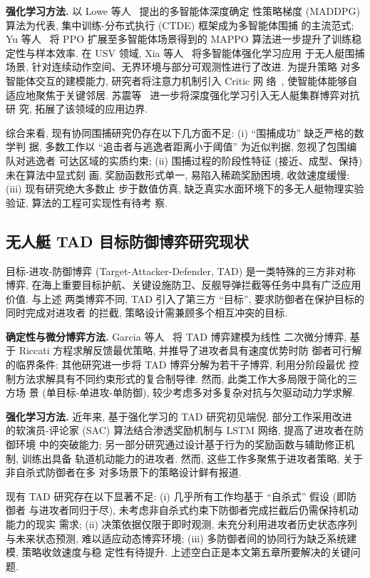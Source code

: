 \textbf{强化学习方法.} 以 Lowe 等人~\cite{lowe2017maddpg} 提出的多智能体深度确定
性策略梯度 (MADDPG) 算法为代表, 集中训练-分布式执行 (CTDE) 框架成为多智能体围捕
的主流范式; Yu 等人~\cite{yu2022surprising} 将 PPO 扩展至多智能体场景得到的
MAPPO 算法进一步提升了训练稳定性与样本效率. 在 USV 领域,
Xia 等人~\cite{xia2023cooperative,xia2023cooperativeusv} 将多智能体强化学习应用
于无人艇围捕场景, 针对连续动作空间、无界环境与部分可观测性进行了改进. 为提升策略
对多智能体交互的建模能力, 研究者将注意力机制引入 Critic 网
络~\cite{vaswani2017attention,iqbal2019maac}, 使智能体能够自适应地聚焦于关键邻居.
苏震等~\cite{su2022confrontation} 进一步将深度强化学习引入无人艇集群博弈对抗研
究, 拓展了该领域的应用边界.

综合来看, 现有协同围捕研究仍存在以下几方面不足: (i) ``围捕成功'' 缺乏严格的数学判
据, 多数工作以 ``追击者与逃逸者距离小于阈值'' 为近似判据, 忽视了包围编队对逃逸者
可达区域的实质约束; (ii) 围捕过程的阶段性特征 (接近、成型、保持) 未在算法中显式刻
画, 奖励函数形式单一, 易陷入稀疏奖励困境, 收敛速度缓慢; (iii) 现有研究绝大多数止
步于数值仿真, 缺乏真实水面环境下的多无人艇物理实验验证, 算法的工程可实现性有待考
察.

\subsection{无人艇 TAD 目标防御博弈研究现状}
\label{subsec:tad_review}
目标-进攻-防御博弈 (Target-Attacker-Defender, TAD) 是一类特殊的三方非对称博弈,
在海上重要目标护航、关键设施防卫、反舰导弹拦截等任务中具有广泛应用价值. 与上述
两类博弈不同, TAD 引入了第三方 ``目标'', 要求防御者在保护目标的同时完成对进攻者
的拦截, 策略设计需兼顾多个相互冲突的目标.

\textbf{确定性与微分博弈方法.}
Garcia 等人~\cite{garcia2015defense,garcia2021target} 将 TAD 博弈建模为线性
二次微分博弈, 基于 Riccati 方程求解反馈最优策略, 并推导了进攻者具有速度优势时防
御者可行解的临界条件; 其他研究进一步将 TAD 博弈分解为若干子博弈, 利用分阶段最优
控制方法求解具有不同约束形式的复合制导律. 然而, 此类工作大多局限于简化的三方场
景 (单目标-单进攻-单防御), 较少考虑多对多复杂对抗与欠驱动动力学求解.

\textbf{强化学习方法.} 近年来, 基于强化学习的 TAD 研究初见端倪. 部分工作采用改进
的软演员-评论家 (SAC) 算法结合渗透奖励机制与 LSTM 网络, 提高了进攻者在防御环境
中的突破能力; 另一部分研究通过设计基于行为的奖励函数与辅助修正机制, 训练出具备
轨道机动能力的进攻者. 然而, 这些工作多聚焦于进攻者策略, 关于非自杀式防御者在多
对多场景下的策略设计鲜有报道.

现有 TAD 研究存在以下显著不足: (i) 几乎所有工作均基于 ``自杀式'' 假设 (即防御者
与进攻者同归于尽), 未考虑非自杀式约束下防御者完成拦截后仍需保持机动能力的现实
需求; (ii) 决策依据仅限于即时观测, 未充分利用进攻者历史状态序列与未来状态预测,
难以适应动态博弈环境; (iii) 多防御者间的协同行为缺乏系统建模, 策略收敛速度与稳
定性有待提升. 上述空白正是本文第五章所要解决的关键问题.

